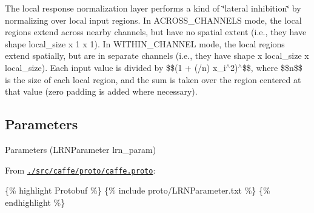 The local response normalization layer performs a kind of \char`\"{}lateral inhibition\char`\"{} by normalizing over local input regions. In {\ttfamily A\+C\+R\+O\+S\+S\+\_\+\+C\+H\+A\+N\+N\+E\+LS} mode, the local regions extend across nearby channels, but have no spatial extent (i.\+e., they have shape {\ttfamily local\+\_\+size x 1 x 1}). In {\ttfamily W\+I\+T\+H\+I\+N\+\_\+\+C\+H\+A\+N\+N\+EL} mode, the local regions extend spatially, but are in separate channels (i.\+e., they have shape { x local\+\_\+size x local\+\_\+size}). Each input value is divided by \$\$(1 + (/n)  x\+\_\+i$^\wedge$2)$^\wedge$\$\$, where \$\$n\$\$ is the size of each local region, and the sum is taken over the region centered at that value (zero padding is added where necessary).

\subsection*{Parameters}


\begin{DoxyItemize}
\item Parameters ({\ttfamily L\+R\+N\+Parameter lrn\+\_\+param})
\item From \href{https://github.com/BVLC/caffe/blob/master/src/caffe/proto/caffe.proto}{\tt {\ttfamily ./src/caffe/proto/caffe.proto}}\+:
\end{DoxyItemize}

\{\% highlight Protobuf \%\} \{\% include proto/\+L\+R\+N\+Parameter.\+txt \%\} \{\% endhighlight \%\} 